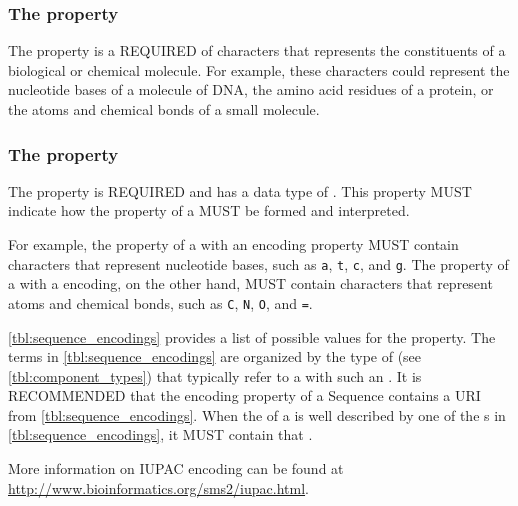 \subsubsection*{The  property}
\label{sec:elements}
The  property is a REQUIRED  of characters that represents the constituents of a biological or chemical molecule. For example, these characters could represent the nucleotide bases of a molecule of DNA, the amino acid residues of a protein, or the atoms and chemical bonds of a small molecule.

\subsubsection*{The  property}
\label{sec:encoding}
The  property is REQUIRED and has a data type of . This property MUST indicate how the  property of a  MUST be formed and interpreted.

For example, the  property of a  with an  encoding property MUST contain characters that represent nucleotide bases, such as {\tt a}, {\tt t}, {\tt c}, and {\tt g}. The  property of a  with a  encoding, on the other hand, MUST contain characters that represent atoms and chemical bonds, such as {\tt C}, {\tt N}, {\tt O}, and {\tt =}.

\ref{tbl:sequence_encodings} provides a list of possible  values for the  property. The terms in \ref{tbl:sequence_encodings} are organized by the type of  (see \ref{tbl:component_types}) that typically refer to a  with such an . It is RECOMMENDED that the encoding property of a Sequence contains a URI from \ref{tbl:sequence_encodings}. When the  of a  is well described by one of the s in \ref{tbl:sequence_encodings}, it MUST contain that .

More information on IUPAC encoding can be found at \url{http://www.bioinformatics.org/sms2/iupac.html}.

